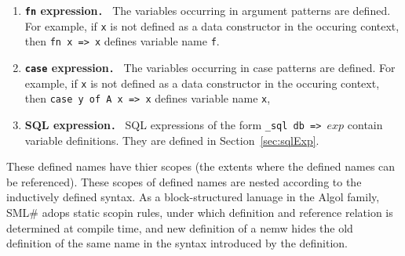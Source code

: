 \documentclass{jbook}
\newcommand{\smlsharp}{SML\#}
\newcommand{\code}[1]{\mbox{\large\tt #1}}
\begin{document}
\begin{enumerate}
\item {\bf \code{fn} expression}．
	The variables occurring in argument patterns are defined.
	For example, if \code{x} is not defined as a data constructor in
the occuring context, then \code{fn x => x} defines variable name \code{f}.
\item {\bf \code{case} expression}．
	The variables occurring in case patterns are defined.
	For example, if \code{x} is not defined as a data constructor in
the occuring context, then \code{case y of A x => x} defines variable
name \code{x},
\item {\bf SQL expression}．
	SQL expressions of the form \code{\_sql db => $exp$}
contain variable definitions.
	They are defined in Section~\ref{sec:sqlExp}.
\end{enumerate}

	These defined names have thier scopes (the extents where the
defined names can be referenced).
	These scopes of defined names are nested according to the inductively
defined syntax.
	As a block-structured lanuage in the Algol family, \smlsharp{}
adops static scopin rules, under which definition and reference relation
is determined at compile time, and new definition of a nemw hides the
old definition of the same name in the syntax introduced by the
definition.
\end{document}
